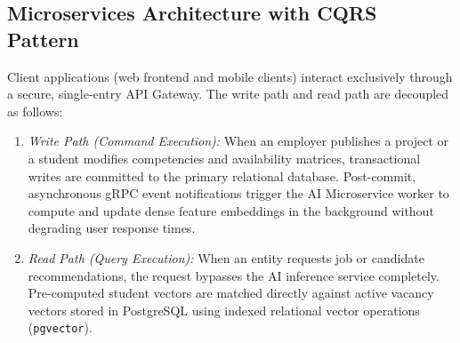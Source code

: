 \documentclass[a4paper,fleqn]{cas-dc}
\begin{document}
\subsection{Microservices Architecture with CQRS Pattern}
Client applications (web frontend and mobile clients) interact exclusively through a secure, single-entry API Gateway. The write path and read path are decoupled as follows:
\begin{enumerate}
    \item \textit{Write Path (Command Execution):} When an employer publishes a project or a student modifies competencies and availability matrices, transactional writes are committed to the primary relational database. Post-commit, asynchronous gRPC event notifications trigger the AI Microservice worker to compute and update dense feature embeddings in the background without degrading user response times.
    \item \textit{Read Path (Query Execution):} When an entity requests job or candidate recommendations, the request bypasses the AI inference service completely. Pre-computed student vectors are matched directly against active vacancy vectors stored in PostgreSQL using indexed relational vector operations (\texttt{pgvector}).
\end{enumerate}
\end{document}
